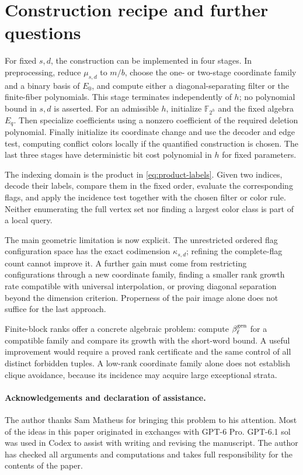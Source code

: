 \documentclass[11pt,a4paper]{article}
\newcommand{\F}{\mathbb F}
\theoremstyle{definition}
\theoremstyle{remark}
\numberwithin{equation}{section}
\begin{document}
\section{Construction recipe and further questions}\label{sec:recipe}
For fixed $s,d$, the construction can be implemented in four stages. In preprocessing, reduce $\mu_{s,d}$ to $m/b$, choose the one- or two-stage coordinate family and a binary basis of $E_0$, and compute either a diagonal-separating filter or the finite-fiber polynomials. This stage terminates independently of $h$; no polynomial bound in $s,d$ is asserted. For an admissible $h$, initialize $\F_{2^h}$ and the fixed algebra $E_q$. Then specialize coefficients using a nonzero coefficient of the required deletion polynomial. Finally initialize its coordinate change and use the decoder and edge test, computing conflict colors locally if the quantified construction is chosen. The last three stages have deterministic bit cost polynomial in $h$ for fixed parameters.

The indexing domain is the product in \eqref{eq:product-labels}. Given two indices, decode their labels, compare them in the fixed order, evaluate the corresponding flags, and apply the incidence test together with the chosen filter or color rule. Neither enumerating the full vertex set nor finding a largest color class is part of a local query.

The main geometric limitation is now explicit. The unrestricted ordered flag configuration space has the exact codimension $\kappa_{s,d}$; refining the complete-flag count cannot improve it. A further gain must come from restricting configurations through a new coordinate family, finding a smaller rank growth rate compatible with universal interpolation, or proving diagonal separation beyond the dimension criterion. Properness of the pair image alone does not suffice for the last approach.

Finite-block ranks offer a concrete algebraic problem: compute $\beta_\ell^{\rm gen}$ for a compatible family and compare its growth with the short-word bound. A useful improvement would require a proved rank certificate and the same control of all distinct forbidden tuples. A low-rank coordinate family alone does not establish clique avoidance, because its incidence may acquire large exceptional strata.

\paragraph{Acknowledgements and declaration of assistance.}
The author thanks Sam Matheus for bringing this problem to his attention. Most of the ideas in this paper originated in exchanges with GPT-6 Pro. GPT-6.1 sol was used in Codex to assist with writing and revising the manuscript. The author has checked all arguments and computations and takes full responsibility for the contents of the paper.
\end{document}

